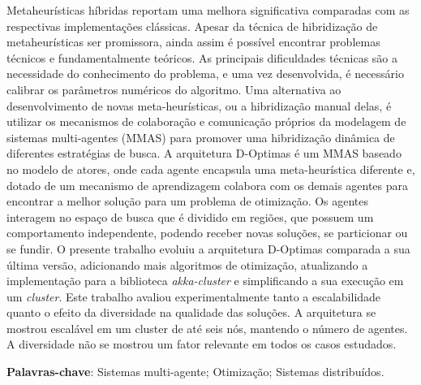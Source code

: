 


\begin{resumo}
Metaheurísticas híbridas reportam uma melhora significativa comparadas com as respectivas implementações clássicas. Apesar da técnica de hibridização de metaheurísticas ser promissora, ainda assim é possível encontrar problemas técnicos e fundamentalmente teóricos. As principais dificuldades técnicas são a necessidade do conhecimento do problema, e uma vez desenvolvida, é necessário calibrar os parâmetros numéricos do algoritmo. Uma alternativa ao desenvolvimento de novas meta-heurísticas, ou a hibridização manual delas, é utilizar os mecanismos de colaboração e comunicação próprios da modelagem de sistemas multi-agentes (MMAS) para promover uma hibridização dinâmica de diferentes estratégias de busca. A arquitetura D-Optimas é um MMAS baseado no modelo de atores, onde cada agente encapsula uma meta-heurística diferente e, dotado de um mecanismo de aprendizagem colabora com os demais agentes para encontrar a melhor solução para um problema de otimização. Os agentes interagem no espaço de busca que é dividido em regiões, que possuem um comportamento independente, podendo receber novas soluções, se particionar ou se fundir. O presente trabalho evoluiu a arquitetura D-Optimas comparada a sua última versão, adicionando mais algoritmos de otimização, atualizando a implementação para a biblioteca \textit{akka-cluster} e simplificando a sua execução em um \textit{cluster}. Este trabalho avaliou experimentalmente tanto a escalabilidade quanto o efeito da diversidade na qualidade das soluções. A arquitetura se mostrou escalável em um cluster de até seis nós, mantendo o número de agentes. A diversidade não se mostrou um fator relevante em todos os casos estudados.

\textbf{Palavras-chave}: Sistemas multi-agente; Otimização; Sistemas distribuídos.
 

\end{resumo}


